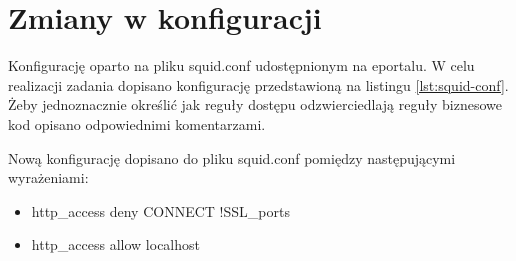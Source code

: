 \documentclass{article}
\begin{document}
\section{Zmiany w konfiguracji}
Konfigurację oparto na pliku squid.conf udostępnionym na eportalu.
W celu realizacji zadania dopisano konfigurację przedstawioną na listingu \ref{lst:squid-conf}.
Żeby jednoznacznie określić jak reguły dostępu odzwierciedlają reguły biznesowe kod opisano odpowiednimi komentarzami.
\par
Nową konfigurację dopisano do pliku squid.conf pomiędzy następującymi wyrażeniami:
\begin{itemize}
    \item http\_access deny CONNECT !SSL\_ports
    \item http\_access allow localhost
\end{itemize}
\end{document}

